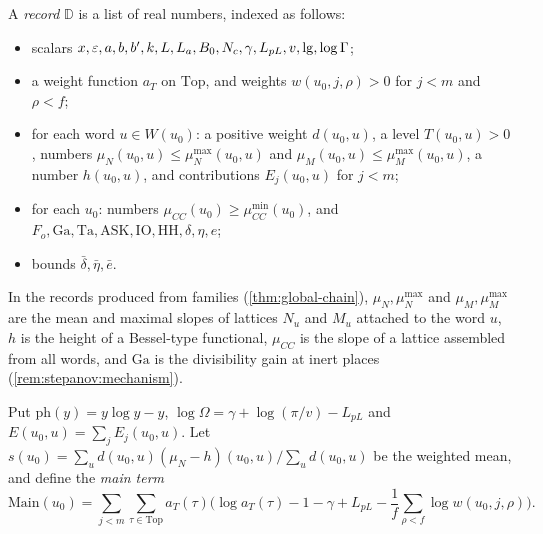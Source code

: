 \begin{definition}[Records]\label{def:record}
A \emph{record} $\mathbb D$ is a list of real numbers, indexed as follows:
\begin{itemize}
\item scalars $x,\varepsilon,a,b,b',k,L,L_a,B_0,N_c,\gamma,L_{pL},v,\mathrm{lg},\log\Gamma$;
\item a weight function $a_T$ on $\mathrm{Top}$, and weights $w(u_0,j,\rho)>0$ for $j<m$ and $\rho<f$;
\item for each word $u\in W(u_0)$: a positive weight $d(u_0,u)$, a level $T(u_0,u)>0$, numbers
$\mu_N(u_0,u)\le\mu^{\max}_N(u_0,u)$ and $\mu_M(u_0,u)\le\mu^{\max}_M(u_0,u)$, a number $h(u_0,u)$, and
contributions $E_j(u_0,u)$ for $j<m$;
\item for each $u_0$: numbers $\mu_{CC}(u_0)\ge\mu^{\min}_{CC}(u_0)$, and
$F_o,\mathrm{Ga},\mathrm{Ta},\mathrm{ASK},\mathrm{IO},\mathrm{HH},\delta,\eta,e$;
\item bounds $\bar\delta,\bar\eta,\bar e$.
\end{itemize}
In the records produced from families (\cref{thm:global-chain}), $\mu_N,\mu^{\max}_N$ and
$\mu_M,\mu^{\max}_M$ are the mean and maximal slopes of lattices $N_u$ and $M_u$ attached to the word
$u$, $h$ is the height of a Bessel-type functional, $\mu_{CC}$ is the slope of a lattice assembled from all
words, and $\mathrm{Ga}$ is the divisibility gain at inert places (\cref{rem:stepanov:mechanism}).

Put $\mathrm{ph}(y)=y\log y-y$, $\log\Omega=\gamma+\log(\pi/v)-L_{pL}$ and $E(u_0,u)=\sum_jE_j(u_0,u)$.
Let $s(u_0)=\sum_u d(u_0,u)(\mu_N-h)(u_0,u)/\sum_ud(u_0,u)$ be the weighted mean, and define the
\emph{main term}
\[
\mathrm{Main}(u_0)=\sum_{j<m}\sum_{\tau\in\mathrm{Top}}a_T(\tau)\Big(\log a_T(\tau)-1-\gamma+L_{pL}
-\frac1f\sum_{\rho<f}\log w(u_0,j,\rho)\Big).
\]
\end{definition}

